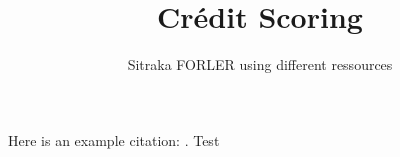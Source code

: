 \documentclass{article}
\title{Crédit Scoring}
\author{Sitraka FORLER using different ressources}
\begin{document}
\maketitle



Here is an example citation: \cite{Lamport1986}.
Test





\end{document}
